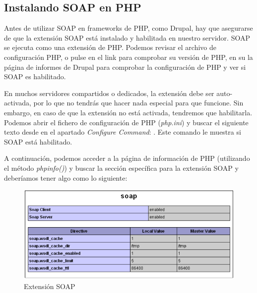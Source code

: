 \subsection{Instalando SOAP en PHP}

Antes de utilizar SOAP en frameworks de PHP, como Drupal, hay que asegurarse de que la extensión SOAP 
está instalado y habilitada en nuestro servidor. SOAP se ejecuta como una extensión de PHP. Podemos revisar 
el archivo de configuración PHP, o pulse en el link para comprobar su versión de PHP, en su la página de 
informes de Drupal para comprobar la configuración de PHP y ver si SOAP es habilitado. 

En muchos servidores compartidos o dedicados, la extensión debe ser auto-activada, por lo que no tendrás que 
hacer nada especial para que funcione. Sin embargo, en caso de que la extensión no está activada, tendremos que habilitarla.
Podemos abrir el fichero de configuración de PHP (\textit{php.ini}) y buscar el siguiente texto desde en el apartado 
\textit{Configure Command}: . Este comando le muestra si SOAP está habilitado. 

A continuación, podemos acceder a la página de información de PHP (utilizando el método \textit{phpinfo()}) y 
buscar la sección específica para la extensión SOAP y deberíamos tener algo como lo siguiente:

\begin{figure}
  \centering
    \includegraphics[scale=0.2]{Assets/Soap/Imagenes/phpinfo.png}
  \caption{Extensión SOAP}
\end{figure}
